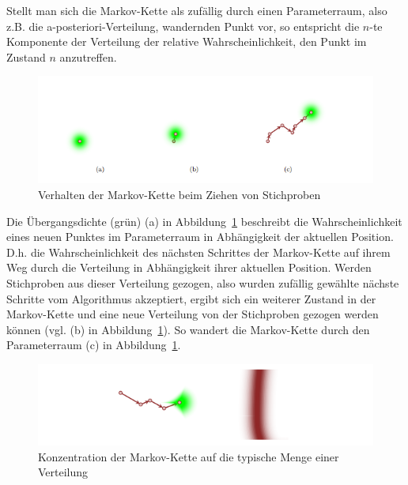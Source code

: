 \documentclass[ngerman]{ttlab-qualify}
\begin{document}
Stellt man sich die Markov-Kette als zufällig durch einen Parameterraum, also z.B. die a-posteriori-Verteilung, wandernden Punkt vor, so entspricht die $n$-te Komponente der Verteilung der relative Wahrscheinlichkeit, den Punkt im Zustand $n$ anzutreffen. 
\begin{figure}[h]
\begin{center}
\includegraphics[scale=.9]{images/markov-chain-plain-betancourt-2017}
\caption{Verhalten der Markov-Kette beim Ziehen von Stichproben \parencite{betancourt:2017}}
\label{fig:markov-chain-plain}
\end{center}
\end{figure}

Die Übergangsdichte (grün) (a) in Abbildung~\ref{fig:markov-chain-plain} beschreibt die Wahrscheinlichkeit eines neuen Punktes im Parameterraum in Abhängigkeit der aktuellen Position. D.h. die Wahrscheinlichkeit des nächsten Schrittes der Markov-Kette auf ihrem Weg durch die Verteilung in Abhängigkeit ihrer aktuellen Position.  Werden Stichproben aus dieser Verteilung gezogen, also wurden zufällig gewählte nächste Schritte vom Algorithmus akzeptiert, ergibt sich ein weiterer Zustand in der Markov-Kette und eine neue Verteilung von der Stichproben gezogen werden können (vgl. (b) in Abbildung~\ref{fig:markov-chain-plain}). So wandert die Markov-Kette durch den Parameterraum (c) in Abbildung~\ref{fig:markov-chain-plain}.

\begin{figure}[H]
\begin{center}
\includegraphics[scale=.9]{images/markov-chain-target-betancourt-2017}
\caption{Konzentration der Markov-Kette auf die typische Menge einer Verteilung \parencite{betancourt:2017}}
\label{fig:markov-chain-target}
\end{center}
\end{figure}
\end{document}
